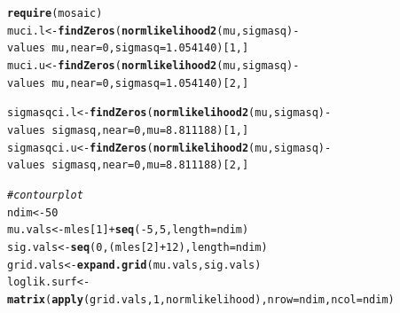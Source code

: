 \documentclass[12pt]{article}\usepackage[]{graphicx}\usepackage[]{color}
\makeatletter
\newcommand{\hlnum}[1]{\textcolor[rgb]{0.686,0.059,0.569}{#1}}%
\newcommand{\hlcom}[1]{\textcolor[rgb]{0.678,0.584,0.686}{\textit{#1}}}%
\newcommand{\hlopt}[1]{\textcolor[rgb]{0,0,0}{#1}}%
\newcommand{\hlstd}[1]{\textcolor[rgb]{0.345,0.345,0.345}{#1}}%
\newcommand{\hlkwb}[1]{\textcolor[rgb]{0.69,0.353,0.396}{#1}}%
\newcommand{\hlkwc}[1]{\textcolor[rgb]{0.333,0.667,0.333}{#1}}%
\newcommand{\hlkwd}[1]{\textcolor[rgb]{0.737,0.353,0.396}{\textbf{#1}}}%
\newenvironment{kframe}{%
 \def\at@end@of@kframe{}%
 \ifinner\ifhmode%
  \def\at@end@of@kframe{\end{minipage}}%
  \begin{minipage}{\columnwidth}%
 \fi\fi%
 \def\FrameCommand##1{\hskip\@totalleftmargin \hskip-\fboxsep
 \colorbox{shadecolor}{##1}\hskip-\fboxsep
     \hskip-\linewidth \hskip-\@totalleftmargin \hskip\columnwidth}%
 \MakeFramed {\advance\hsize-\width
   \@totalleftmargin\z@ \linewidth\hsize
   \@setminipage}}%
 {\par\unskip\endMakeFramed%
 \at@end@of@kframe}
\newenvironment{knitrout}{}{} %
\makeatother
\begin{document}
\begin{knitrout}
\begin{kframe}
\begin{alltt}
\hlkwd{require}\hlstd{(mosaic)}
\hlstd{muci.l} \hlkwb{<-} \hlkwd{findZeros}\hlstd{(}\hlkwd{normlikelihood2}\hlstd{(mu, sigmasq)}\hlopt{-}\hlstd{values} \hlopt{~} \hlstd{mu,} \hlkwc{near}\hlstd{=}\hlnum{0}\hlstd{,} \hlkwc{sigmasq}\hlstd{=}\hlnum{1.054140}\hlstd{)[}\hlnum{1}\hlstd{,]}
\hlstd{muci.u} \hlkwb{<-} \hlkwd{findZeros}\hlstd{(}\hlkwd{normlikelihood2}\hlstd{(mu, sigmasq)}\hlopt{-}\hlstd{values} \hlopt{~} \hlstd{mu,} \hlkwc{near}\hlstd{=}\hlnum{0}\hlstd{,} \hlkwc{sigmasq}\hlstd{=}\hlnum{1.054140}\hlstd{)[}\hlnum{2}\hlstd{,]}

\hlstd{sigmasqci.l} \hlkwb{<-} \hlkwd{findZeros}\hlstd{(}\hlkwd{normlikelihood2}\hlstd{(mu, sigmasq)}\hlopt{-}\hlstd{values} \hlopt{~} \hlstd{sigmasq,} \hlkwc{near}\hlstd{=}\hlnum{0}\hlstd{,} \hlkwc{mu}\hlstd{=}\hlnum{8.811188}\hlstd{)[}\hlnum{1}\hlstd{,]}
\hlstd{sigmasqci.u} \hlkwb{<-} \hlkwd{findZeros}\hlstd{(}\hlkwd{normlikelihood2}\hlstd{(mu, sigmasq)}\hlopt{-}\hlstd{values} \hlopt{~} \hlstd{sigmasq,} \hlkwc{near}\hlstd{=}\hlnum{0}\hlstd{,} \hlkwc{mu}\hlstd{=}\hlnum{8.811188}\hlstd{)[}\hlnum{2}\hlstd{,]}


\hlcom{#contour plot}
\hlstd{ndim} \hlkwb{<-} \hlnum{50}
\hlstd{mu.vals} \hlkwb{<-} \hlstd{mles[}\hlnum{1}\hlstd{]} \hlopt{+} \hlkwd{seq}\hlstd{(}\hlopt{-}\hlnum{5}\hlstd{,}\hlnum{5}\hlstd{,} \hlkwc{length}\hlstd{=ndim)}
\hlstd{sig.vals} \hlkwb{<-} \hlkwd{seq}\hlstd{(}\hlnum{0}\hlstd{, (mles[}\hlnum{2}\hlstd{]} \hlopt{+} \hlnum{12}\hlstd{),} \hlkwc{length}\hlstd{=ndim)}
\hlstd{grid.vals} \hlkwb{<-} \hlkwd{expand.grid}\hlstd{(mu.vals,sig.vals)}
\hlstd{loglik.surf} \hlkwb{<-} \hlkwd{matrix}\hlstd{(}\hlkwd{apply}\hlstd{(grid.vals,}\hlnum{1}\hlstd{,normlikelihood),} \hlkwc{nrow}\hlstd{=ndim,} \hlkwc{ncol}\hlstd{=ndim)}


\end{alltt}
\end{kframe}
\end{knitrout}
\end{document}
